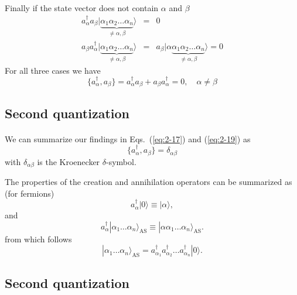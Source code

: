 \documentclass[%
twoside,                 %
final,                   %
10pt]{article}
\begin{document}
\paragraph{}
Finally if the state vector does not contain $\alpha$ and $\beta$
\begin{eqnarray}
	a_\alpha^{\dagger} a_\beta |\underbrace{\alpha_1\alpha_2 \dots \alpha_{n}}_{\neq \alpha,\beta}\rangle &=& 0 \nonumber \\
	a_\beta a_\alpha^{\dagger} |\underbrace{\alpha_1\alpha_2 \dots \alpha_{n}}_{\neq \alpha,\beta}\rangle &=& 
		a_\beta |\alpha \underbrace{\alpha_1\alpha_2 \dots \alpha_{n}}_{\neq \alpha,\beta}\rangle = 0 \label{eq:2-18c}
\end{eqnarray}
For all three cases we have
\begin{equation}
	\{a_\alpha^{\dagger},a_\beta \} = a_\alpha^{\dagger} a_\beta + a_\beta a_\alpha^{\dagger} = 0, \quad \alpha \neq \beta \label{eq:2-19}
\end{equation}




\subsection{Second quantization}

\paragraph{}
We can summarize  our findings in Eqs.~(\ref{eq:2-17}) and (\ref{eq:2-19}) as 
\begin{equation}
	\{a_\alpha^{\dagger},a_\beta \} = \delta_{\alpha\beta} \label{eq:2-20}
\end{equation}
with  $\delta_{\alpha\beta}$ is the Kroenecker $\delta$-symbol.

The properties of the creation and annihilation operators can be summarized as (for fermions)
\[
	a_\alpha^{\dagger}|0\rangle \equiv  |\alpha\rangle,
\]
and
\[
	a_\alpha^{\dagger}|\alpha_1\dots \alpha_n\rangle_{\mathrm{AS}} \equiv  |\alpha\alpha_1\dots \alpha_n\rangle_{\mathrm{AS}}. 
\]
from which follows
\[
        |\alpha_1\dots \alpha_n\rangle_{\mathrm{AS}} = a_{\alpha_1}^{\dagger} a_{\alpha_2}^{\dagger} \dots a_{\alpha_n}^{\dagger} |0\rangle.
\]




\subsection{Second quantization}
\end{document}
